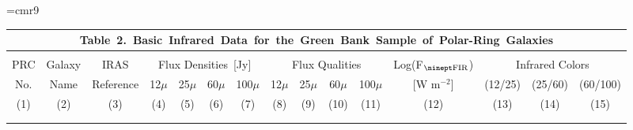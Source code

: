 
\pagestyle{empty}
\samepage
\font\ninept=cmr9
\hsize=10in
\vsize=6.5in
\hoffset-1.25in
\voffset-1.25in
%
\def\ie{{\it ie.,\/}}
%
\begin{tabular}{|c|l|c|rrrr|cccc|c|ccc|}
\multicolumn{15}{c}{{\bf Table~2}.\ 
Basic~Infrared~Data~for~the~Green~Bank~Sample~of~Polar-Ring~Galaxies}\\ [4pt]\hline
&&&&&&&&&&&&&&\\
\noalign{\vskip-6pt}
PRC
&\multicolumn{1}{c|}{Galaxy}
&\multicolumn{1}{c|}{IRAS}
&\multicolumn{4}{c|}{Flux Densities~[Jy]}
&\multicolumn{4}{c|}{Flux Qualities}
&\multicolumn{1}{c|}{Log(F$_{\rm {\ninept FIR}}$)}
&\multicolumn{3}{c|}{Infrared Colors}\\
No.
&\multicolumn{1}{c|}{Name}
&\multicolumn{1}{c|}{Reference}
&\multicolumn{1}{c}{12$\mu$}
&\multicolumn{1}{c}{25$\mu$}
&\multicolumn{1}{c}{60$\mu$}
&\multicolumn{1}{c|}{100$\mu$}
&\multicolumn{1}{c}{12$\mu$}
&\multicolumn{1}{c}{25$\mu$}
&\multicolumn{1}{c}{60$\mu$}
&\multicolumn{1}{c|}{100$\mu$}
&\multicolumn{1}{c|}{[W m$^{-2}$]}
&\multicolumn{1}{c}{(12/25)}
&\multicolumn{1}{c}{(25/60)}
&\multicolumn{1}{c|}{(60/100)}
\\
(1)
&\multicolumn{1}{c|}{(2)}
&\multicolumn{1}{c|}{(3)}
&\multicolumn{1}{c}{(4)}
&\multicolumn{1}{c}{(5)}
&\multicolumn{1}{c}{(6)}
&\multicolumn{1}{c|}{(7)}
&\multicolumn{1}{c}{(8)}
&\multicolumn{1}{c}{(9)}
&\multicolumn{1}{c}{(10)}
&\multicolumn{1}{c|}{(11)}
&\multicolumn{1}{c|}{(12)}
&\multicolumn{1}{c}{(13)}
&\multicolumn{1}{c}{(14)}
&\multicolumn{1}{c|}{(15)}\\ 
[4pt]\hline
&&&&&&&&&&&&&&\\
\noalign{\vskip-6pt}


\end{tabular}
